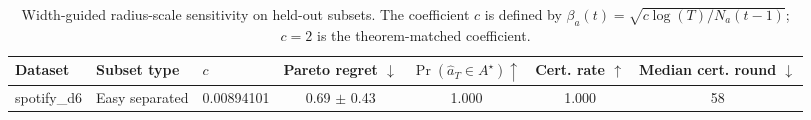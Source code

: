 \begin{table}[t]
\centering
\caption{Width-guided radius-scale sensitivity on held-out subsets. The coefficient $c$ is defined by $\beta_a(t)=\sqrt{c\log(T)/N_a(t-1)}$; $c=2$ is the theorem-matched coefficient.}
\label{tab:app-width-sensitivity}
\scriptsize
\setlength{\tabcolsep}{3pt}
\begin{tabular}{lllcccc}
\toprule
Dataset & Subset type & $c$ & Pareto regret $\downarrow$ & $\Pr(\widehat a_T\in A^\star)\uparrow$ & Cert. rate $\uparrow$ & Median cert. round $\downarrow$ \\
\midrule
spotify\_d6 & Easy separated & 0.00894101 & 0.69 $\pm$ 0.43 & 1.000 & 1.000 & 58 \\
\bottomrule
\end{tabular}
\end{table}
